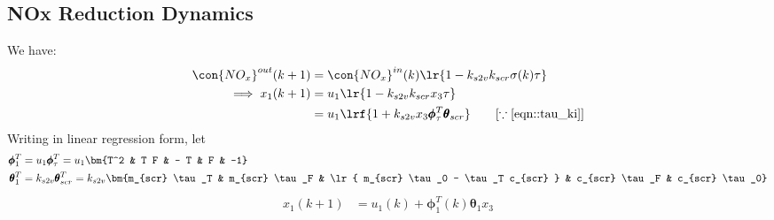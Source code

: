 \subsection{NOx Reduction Dynamics}
We have:
\begin{align*}
    \con{NO_x}^{out} (k + 1) &= \con{NO_x}^{in} (k) \lr{1 - k_{s2v} k_{scr} \sigma(k) \tau}\\
    \implies x_1 (k+1) &= u_1 \lr{1 - k_{s2v} k_{scr} x_3 \tau}\\
                       &= u_1 \lrf{1 + k_{s2v} x_3 \pmb \phi_\tau^T \pmb \theta_{scr}} \qquad [\because \ref{eqn::tau_ki}]
\end{align*}
Writing in linear regression form, let
\begin{align*}
    \pmb \phi_1^T &= u_1 \pmb \phi_\tau^T = u_1 \bm{T^2 &  T F & - T &  F & -1} \\
    \pmb \theta_1^T &= k_{s2v} \pmb \theta_{scr}^T = k_{s2v} \bm{m_{scr} \tau_T &
                                                               m_{scr} \tau_F &
                                                               \lr{ m_{scr} \tau_0  -  \tau_T c_{scr} } &
                                                               c_{scr} \tau_F &
                                                               c_{scr} \tau_0}
\end{align*}
\begin{align}
    x_1(k+1) &= u_1(k) + \pmb \phi_1^T (k) \pmb \theta_1 x_3  \label{eqn::nox_regression}
\end{align}















